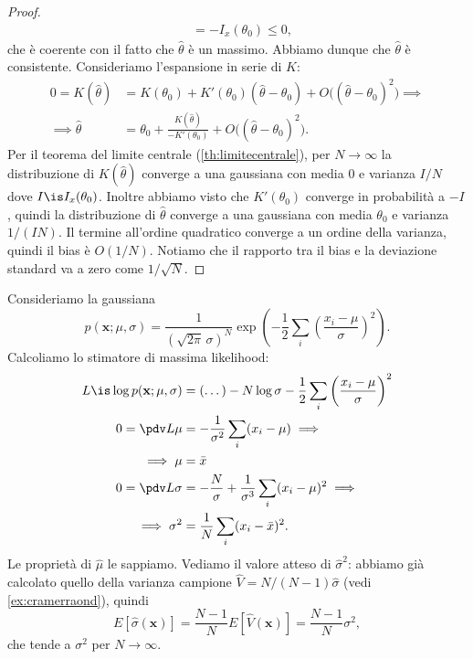 \begin{proof}
\begin{align*}
		&= -I_x(\theta_0)
		\le 0,
	\end{align*}
	che è coerente con il fatto che $\hat\theta$ è un massimo.
	Abbiamo dunque che $\hat\theta$ è consistente.
	Consideriamo l'espansione in serie di $K$:
	\begin{align*}
		0 = K(\hat\theta)
		&= K(\theta_0) + K'(\theta_0)(\hat\theta-\theta_0) + O\big((\hat\theta-\theta_0)^2\big) \implies \\
		\implies \hat\theta
		&= \theta_0 + \frac{K(\hat\theta)}{-K'(\theta_0)} + O\big((\hat\theta-\theta_0)^2\big).
	\end{align*}
	Per il teorema del limite centrale (\autoref{th:limitecentrale}),
	per $N\to\infty$
	la distribuzione di $K(\hat\theta)$ converge a una gaussiana
	con media 0 e varianza $I/N$ dove $I\is I_x(\theta_0)$.
	Inoltre abbiamo visto che $K'(\theta_0)$ converge in probabilità a $-I$,
	quindi la distribuzione di $\hat\theta$ converge a una gaussiana
	con media $\theta_0$ e varianza $1/(IN)$.
	Il termine all'ordine quadratico converge a un ordine della varianza,
	quindi il bias è $O(1/N)$.
	Notiamo che il rapporto tra il bias e la deviazione standard va a zero come $1/\sqrt{N}$.
\end{proof}

\begin{example}
	Consideriamo la gaussiana
	\begin{equation*}
		p(\mathbf x;\mu,\sigma)
		= \frac1{(\sqrt{2\pi}\,\sigma)^N} \exp \left( -\frac12\sum_i\left(\frac{x_i-\mu}\sigma\right)^2 \right).
	\end{equation*}
	Calcoliamo lo stimatore di massima likelihood:
	\begin{align*}
		L \is \log p(\mathbf x;\mu,\sigma)
		&= (\dots) - N\log\sigma - \frac12 \sum_i \left( \frac{x_i-\mu}\sigma \right)^2 \\
		0 = \pdv L\mu
		&= -\frac1{\sigma^2}\sum_i (x_i-\mu) \implies \\
		\implies \mu
		&= \bar x \\
		0 = \pdv L\sigma
		&= -\frac N\sigma + \frac1{\sigma^3}\sum_i (x_i-\mu)^2 \implies \\
		\implies \sigma^2
		&= \frac1N \sum_i (x_i-\bar x)^2.
	\end{align*}
	Le proprietà di $\hat\mu$ le sappiamo.
	Vediamo il valore atteso di $\hat\sigma^2$: abbiamo già calcolato
    quello della varianza campione $\hat V = N/(N-1)\hat\sigma$ (vedi
    \autoref{ex:cramerraond}), quindi
    \begin{equation*}
        E[\hat\sigma(\mathbf x)]
        = \frac{N-1}N E[\hat V(\mathbf x)]
        = \frac{N-1}N \sigma^2,
    \end{equation*}
    che tende a $\sigma^2$ per $N\to\infty$.
\end{example}


